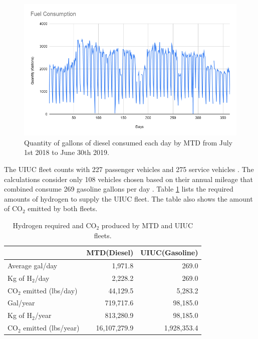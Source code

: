\documentclass{anstrans}
\begin{document}
\begin{figure}[!h]
	\centering
	\includegraphics[width=1.05\linewidth]{figures/fuelconsumption.png}
	\hfill
	\caption{Quantity of gallons of diesel consumed each day by MTD from July 1st 2018 to June 30th 2019.}
	\label{fig:mtdfuel}
\end{figure}

The UIUC fleet counts with 227 passenger vehicles and 275 service vehicles \cite{noauthor_increase_2020}. The calculations consider only 108 vehicles chosen based on their annual mileage that combined consume 269 gasoline gallons per day \cite{holcomb_fueling_2015}. Table \ref{tab:h2req} lists the required amounts of hydrogen to supply the UIUC fleet. The table also shows the amount of CO$_2$ emitted by both fleets.

\begin{table}[]
	\centering
    \caption{Hydrogen required and CO$_2$ produced by MTD and UIUC fleets.}
    \label{tab:h2req}
\begin{tabular}{l|rr}
\hline
                          & MTD(Diesel)      & UIUC(Gasoline)   \\ \hline
Average gal/day           & 1,971.8          & 269.0            \\
Kg of H$_2$/day           & 2,228.2          & 269.0            \\
CO$_2$ emitted (lbs/day)  & 44,129.5         & 5,283.2          \\
Gal/year                  & 719,717.6        & 98,185.0         \\
Kg of H$_2$/year          & 813,280.9        & 98,185.0         \\
CO$_2$ emitted (lbs/year) & 16,107,279.9     & 1,928,353.4      \\ \hline
\end{tabular}
\end{table}
\end{document}
